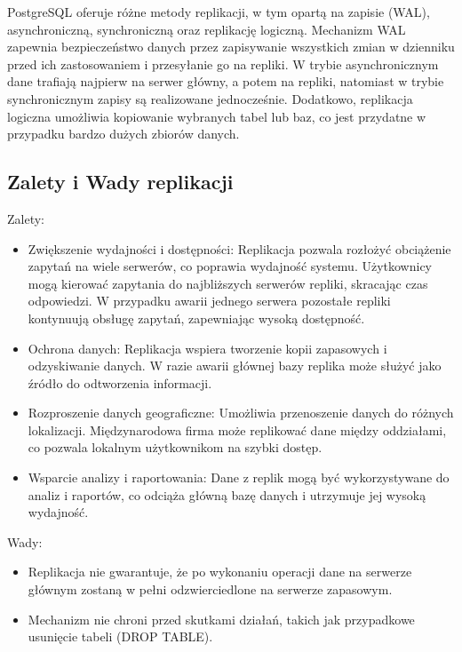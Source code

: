 \documentclass[a4paper,11pt,polish]{sphinxmanual}
\begin{document}
\sphinxAtStartPar
PostgreSQL oferuje różne metody replikacji, w tym opartą na zapisie (WAL), asynchroniczną, synchroniczną oraz replikację logiczną. Mechanizm WAL zapewnia bezpieczeństwo danych przez zapisywanie wszystkich zmian w dzienniku przed ich zastosowaniem i przesyłanie go na repliki. W trybie asynchronicznym dane trafiają najpierw na serwer główny, a potem na repliki, natomiast w trybie synchronicznym zapisy są realizowane jednocześnie. Dodatkowo, replikacja logiczna umożliwia kopiowanie wybranych tabel lub baz, co jest przydatne w przypadku bardzo dużych zbiorów danych.


\subsection{Zalety i Wady replikacji}
\label{\detokenize{Wydajnosc-Skalowanie-i-Replikacja/index:zalety-i-wady-replikacji}}
\sphinxAtStartPar
Zalety:
\begin{itemize}
\item {} 
\sphinxAtStartPar
Zwiększenie wydajności i dostępności: Replikacja pozwala rozłożyć obciążenie zapytań na wiele serwerów, co poprawia wydajność systemu. Użytkownicy mogą kierować zapytania do najbliższych serwerów repliki, skracając czas odpowiedzi. W przypadku awarii jednego serwera pozostałe repliki kontynuują obsługę zapytań, zapewniając wysoką dostępność.

\item {} 
\sphinxAtStartPar
Ochrona danych: Replikacja wspiera tworzenie kopii zapasowych i odzyskiwanie danych. W razie awarii głównej bazy replika może służyć jako źródło do odtworzenia informacji.

\item {} 
\sphinxAtStartPar
Rozproszenie danych geograficzne: Umożliwia przenoszenie danych do różnych lokalizacji. Międzynarodowa firma może replikować dane między oddziałami, co pozwala lokalnym użytkownikom na szybki dostęp.

\item {} 
\sphinxAtStartPar
Wsparcie analizy i raportowania: Dane z replik mogą być wykorzystywane do analiz i raportów, co odciąża główną bazę danych i utrzymuje jej wysoką wydajność.

\end{itemize}

\sphinxAtStartPar
Wady:
\begin{itemize}
\item {} 
\sphinxAtStartPar
Replikacja nie gwarantuje, że po wykonaniu operacji dane na serwerze głównym zostaną w pełni odzwierciedlone na serwerze zapasowym.

\item {} 
\sphinxAtStartPar
Mechanizm nie chroni przed skutkami działań, takich jak przypadkowe usunięcie tabeli (DROP TABLE).

\end{itemize}
\end{document}
